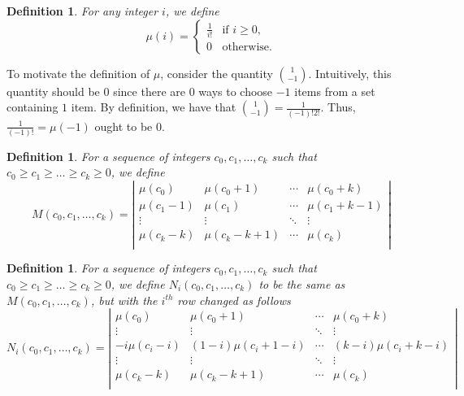 \documentclass[12pt]{amsart}
\newtheorem{definition}[theorem]{Definition}
\newcommand{\ifact}{\mu}
\newcommand{\M}{M}
\newcommand{\N}{N}
\begin{document}
\begin{definition}
For any integer $i$, we define
$$
\ifact(i) = 
\begin{cases}
\frac{1}{i!} & \text{if } i \geq 0, \\
0 & \text{otherwise.}
\end{cases}
$$
\end{definition}

To motivate the definition of $\ifact$, consider the quantity $\binom{1}{-1}$. Intuitively, this quantity should be $0$ since there are $0$ ways to choose $-1$ items from a set containing $1$ item. By definition, we have that $\binom{1}{-1} = \frac{1}{(-1)!2!}$. Thus, $\frac{1}{(-1)!} = \ifact(-1)$ ought to be $0$.

\begin{definition}
For a sequence of integers $c_0, c_1, \dots, c_k$ such that $c_0 \geq c_1 \geq \dots \geq c_k \geq 0$, we define
$$
\M(c_0, c_1, \dots, c_k) = \left|
\begin{matrix}
\ifact(c_0) & \ifact(c_0+1) & \cdots & \ifact(c_0+k) \\
\ifact(c_1-1) & \ifact(c_1) & \cdots & \ifact(c_1+k-1) \\
\vdots & \vdots & \ddots & \vdots \\
\ifact(c_k-k) & \ifact(c_k-k+1) & \cdots & \ifact(c_k) \\
\end{matrix} \right|
$$
\end{definition}

\begin{definition}
For a sequence of integers $c_0, c_1, \dots, c_k$ such that $c_0 \geq c_1 \geq \dots \geq c_k \geq 0$, we define $\N_i(c_0,c_1,\dots,c_k)$ to be the same as $\M(c_0, c_1, \dots, c_k)$, but with the $i^{th}$ row changed as follows
$$
\N_i(c_0, c_1, \dots, c_k) = \left|
\begin{matrix}
\ifact(c_0) & \ifact(c_0+1) & \cdots & \ifact(c_0+k) \\
\vdots & \vdots & \ddots & \vdots \\
-i\ifact(c_i-i) & (1-i)\ifact(c_i + 1 - i) & \cdots & (k-i) \ifact(c_i+k-i) \\
\vdots & \vdots & \ddots & \vdots \\
\ifact(c_k-k) & \ifact(c_k-k+1) & \cdots & \ifact(c_k) \\
\end{matrix} \right|
$$
\end{definition}

\vspace{0.75cm}
\end{document}

